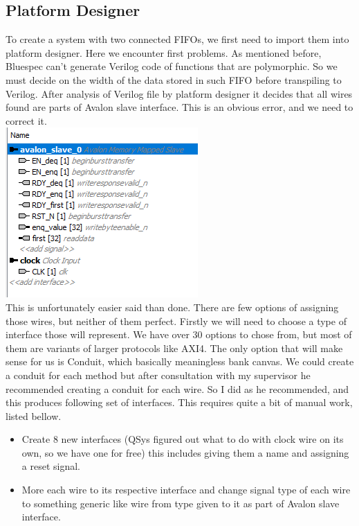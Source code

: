 \documentclass[14pt]{report}
\begin{document}
\subsection{Platform Designer}
To create a system with two connected FIFOs, we first need to import them into platform designer. Here we encounter first problems. As mentioned before, Bluespec can't generate Verilog code of functions that are polymorphic. So we must decide on the width of the data stored in such FIFO before transpiling to Verilog. After analysis of Verilog file by platform designer it decides that all wires found are parts of Avalon slave interface. This is an obvious error, and we need to correct it. \\
\includegraphics{images/Example1BeforeOranization.png} \\
This is unfortunately easier said than done. There are few options of assigning those wires, but neither of them perfect. Firstly we will need to choose a type of interface those will represent. We have over 30 options to chose from, but most of them are variants of larger protocols like AXI4. The only option that will make sense for us is Conduit, which basically meaningless bank canvas. We could create a conduit for each method but after consultation with my supervisor he recommended creating a conduit for each wire. So I did as he recommended, and this produces following set of interfaces. This requires quite a bit of manual work, listed bellow.
\begin{itemize}
    \item Create 8 new interfaces (QSys figured out what to do with clock wire on its own, so we have one for free) this includes giving them a name and assigning a reset signal.
    \item More each wire to its respective interface and change signal type of each wire to something generic like wire from type given to it as part of Avalon slave interface. 
\end{itemize}
\end{document}
